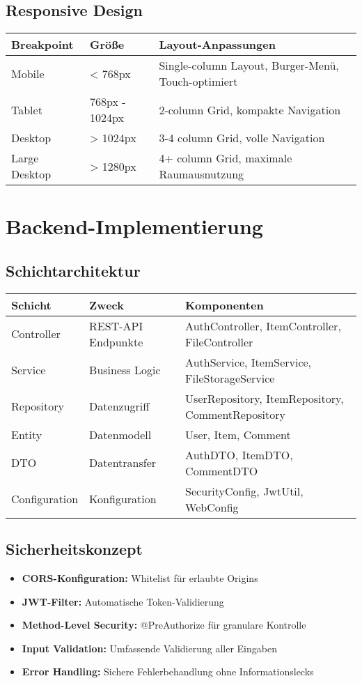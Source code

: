 \documentclass[a4paper,12pt]{article}
\begin{document}
\subsection{Responsive Design}
\begin{longtable}{|p{}|p{}|p{}|}
\hline
\textbf{Breakpoint} & \textbf{Größe} & \textbf{Layout-Anpassungen} \\
\hline
Mobile & < 768px & Single-column Layout, Burger-Menü, Touch-optimiert \\
\hline
Tablet & 768px - 1024px & 2-column Grid, kompakte Navigation \\
\hline
Desktop & > 1024px & 3-4 column Grid, volle Navigation \\
\hline
Large Desktop & > 1280px & 4+ column Grid, maximale Raumausnutzung \\
\hline
\end{longtable}

\section{Backend-Implementierung}

\subsection{Schichtarchitektur}
\begin{longtable}{|p{}|p{}|p{}|}
\hline
\textbf{Schicht} & \textbf{Zweck} & \textbf{Komponenten} \\
\hline
Controller & REST-API Endpunkte & AuthController, ItemController, FileController \\
\hline
Service & Business Logic & AuthService, ItemService, FileStorageService \\
\hline
Repository & Datenzugriff & UserRepository, ItemRepository, CommentRepository \\
\hline
Entity & Datenmodell & User, Item, Comment \\
\hline
DTO & Datentransfer & AuthDTO, ItemDTO, CommentDTO \\
\hline
Configuration & Konfiguration & SecurityConfig, JwtUtil, WebConfig \\
\hline
\end{longtable}

\subsection{Sicherheitskonzept}
\begin{itemize}
    \item \textbf{CORS-Konfiguration:} Whitelist für erlaubte Origins
    \item \textbf{JWT-Filter:} Automatische Token-Validierung
    \item \textbf{Method-Level Security:} @PreAuthorize für granulare Kontrolle
    \item \textbf{Input Validation:} Umfassende Validierung aller Eingaben
    \item \textbf{Error Handling:} Sichere Fehlerbehandlung ohne Informationslecks
\end{itemize}
\end{document}
